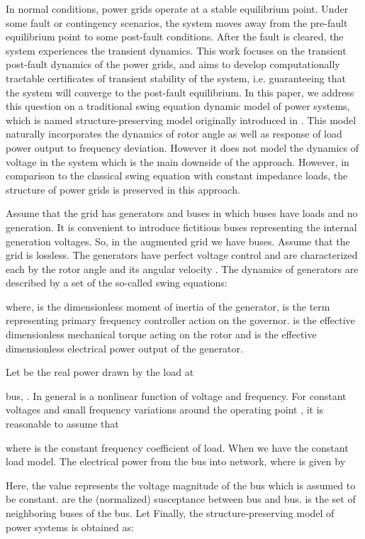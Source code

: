\documentclass[final]{IEEEtran}
\begin{document}
In normal conditions, power grids operate at a stable equilibrium
point. Under some fault or contingency scenarios, the system moves
away from the pre-fault equilibrium point to some post-fault
conditions. After the fault is cleared, the system experiences the
transient dynamics. This work focuses on the transient post-fault
dynamics of the power grids, and aims to develop computationally
tractable certificates of transient stability of the system, i.e.
guaranteeing that the system will converge to the post-fault
equilibrium. In this paper, we address this question on a
traditional swing equation dynamic model of power systems, which is named structure-preserving model originally introduced in \cite{bergen1981structure}.
This model naturally incorporates the dynamics of rotor angle as well as response of load power output to frequency deviation. However it does not model the dynamics of voltage in the system which is the main downside of the approach. However, in comparison to the classical swing equation with constant impedance loads, the structure of power grids is preserved in this approach.

Assume that the grid has  generators and  buses in which  buses have loads and no generation. It is convenient to introduce fictitious buses representing the internal generation voltages. So, in the augmented grid we have  buses. Assume that the grid is lossless. The 
generators have perfect voltage control and are characterized each
by the rotor angle  and its angular velocity
. The dynamics of generators are described by a set
of the so-called swing equations:

where,  is the dimensionless moment of inertia of the
generator,  is the term representing primary frequency
controller action on the governor.  is the effective
dimensionless mechanical torque acting on the rotor and 
is the effective dimensionless electrical power output of the
 generator. 


Let  be the real power drawn by the load at

bus, . In general  is a nonlinear function of voltage and frequency. For constant voltages and small
frequency variations around the operating point , it is reasonable to assume that

where  is  the constant frequency coefficient of load. When  we have the constant load model.
The electrical power 
 from the
 bus into network, where  is given by

Here, the value  represents the voltage
magnitude of the  bus which is
assumed to be constant. 
 are the (normalized)  susceptance between  bus and  bus.  is the set of neighboring
buses of the  bus. Let 
Finally, the structure-preserving model of power systems is obtained as:
\end{document}
